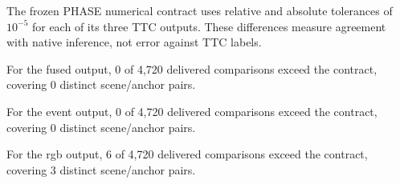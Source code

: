 The frozen PHASE numerical contract uses relative and absolute tolerances of $10^{-5}$ for each of its three TTC outputs. These differences measure agreement with native inference, not error against TTC labels.

For the fused output, 0 of 4,720 delivered comparisons exceed the contract, covering 0 distinct scene/anchor pairs.

For the event output, 0 of 4,720 delivered comparisons exceed the contract, covering 0 distinct scene/anchor pairs.

For the rgb output, 6 of 4,720 delivered comparisons exceed the contract, covering 3 distinct scene/anchor pairs.
